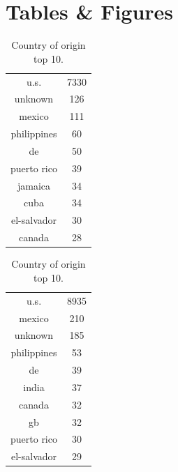 \section{Tables \& Figures}
\label{sec:tables}

\begin{table}[!h]
    \caption{Country of origin top 10.}
    \label{tab:country-of-origin}

    \begin{subtable}[ht]{.5\textwidth}
    \centering
    \begin{tabular}{cc}
        u.s. & 7330 \\
        unknown & 126 \\
        mexico & 111 \\
        philippines & 60 \\
        de & 50 \\
        puerto rico & 39 \\
        jamaica & 34 \\
        cuba & 34 \\
        el-salvador & 30 \\
        canada & 28 \\
    \end{tabular}
    \end{subtable}
    \begin{subtable}[ht]{.5\textwidth}
    \centering
    \begin{tabular}{cc}
        u.s. & 8935 \\
        mexico & 210 \\
        unknown & 185 \\
        philippines & 53 \\
        de & 39 \\
        india & 37 \\
        canada & 32 \\
        gb & 32 \\
        puerto rico & 30 \\
        el-salvador & 29 \\
    \end{tabular}
    \end{subtable}

    \vspace{5mm}


\end{table}
